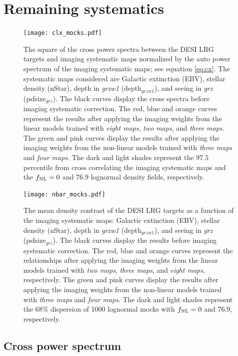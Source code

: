 \section{Remaining systematics}\label{sec:systests}

\begin{figure}
\centering
\texttt{[image: clx\_mocks.pdf]}
\caption{The square of the cross power spectra between the DESI LRG targets and imaging systematic maps normalized by the auto power spectrum of the imaging systematic maps; see equation \ref{eq:cx}. The systematic maps considered are Galactic extinction (EBV), stellar density (nStar), depth in \textit{grzw1} (depth$_{grzw1}$), and seeing in \textit{grz} (psfsize$_{grz}$). The black curves display the cross spectra before imaging systematic correction. The red, blue and orange curves represent the results after applying the imaging weights from the linear models trained with \textit{eight maps}, \textit{two maps}, and \textit{three maps}. The green and pink curves display the results after applying the imaging weights from the non-linear models trained with \textit{three maps} and \textit{four maps}. The dark and light shades represent the $97.5$ percentile from cross correlating the imaging systematic maps and the $f_{\rm NL}=0$ and $76.9$ lognormal density fields, respectively.}\label{fig:clxmock}
\end{figure}

\begin{figure}
\centering
\texttt{[image: nbar\_mocks.pdf]}
\caption{The mean density contrast of the DESI LRG targets as a function of the imaging systematic maps: Galactic extinction (EBV), stellar density (nStar), depth in \textit{grzw1} (depth$_{grzw1}$), and seeing in \textit{grz} (psfsize$_{grz}$). The black curves display the results before imaging systematic correction. The red, blue and orange curves represent the relationships after applying the imaging weights from the linear models trained with \textit{two maps}, \textit{three maps}, and \textit{eight maps}, respectively. The green and pink curves display the results after applying the imaging weights from the non-linear models trained with \textit{three maps} and \textit{four maps}. The dark and light shades represent the $68\%$ dispersion of 1000 lognormal mocks with $f_{\rm NL}=0$ and $76.9$, respectively.}\label{fig:nbarmock}
\end{figure}

\subsection{Cross power spectrum}

